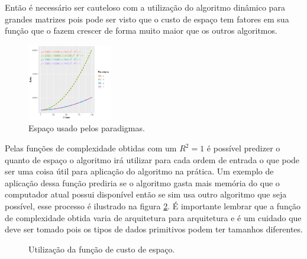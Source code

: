 \documentclass[10.9pt]{article}
\begin{document}
Então é necessário ser cauteloso com a utilização do algoritmo dinâmico para grandes matrizes pois pode ser visto que o custo de espaço tem fatores em sua função que o fazem crescer de forma muito maior que os outros algoritmos. 

\begin{figure}[htbp]
\centering
\includegraphics[width=0.33\textwidth]{espaco.jpg}
\caption{Espaço usado pelos paradigmas.\label{fig:espaco}}
\end{figure}

Pelas funções de complexidade obtidas com um \(R^2=1\) é possível predizer o quanto de espaço o algoritmo irá utilizar para cada ordem de entrada o que pode ser uma coisa útil para aplicação do algoritmo na prática. Um exemplo de aplicação dessa função prediria se o algoritmo gasta mais memória do que o computador atual possui disponível então se sim usa outro algoritmo que seja possível, esse processo é ilustrado na figura \ref{fig:spacepredict}. É importante lembrar que a função de complexidade obtida varia de arquitetura para arquitetura e é um cuidado que deve ser tomado pois os tipos de dados primitivos podem ter tamanhos diferentes.
\begin{figure}
\centering
{}
\caption{Utilização da função de custo de espaço.}\label{fig:spacepredict}
\end{figure}
\end{document}
